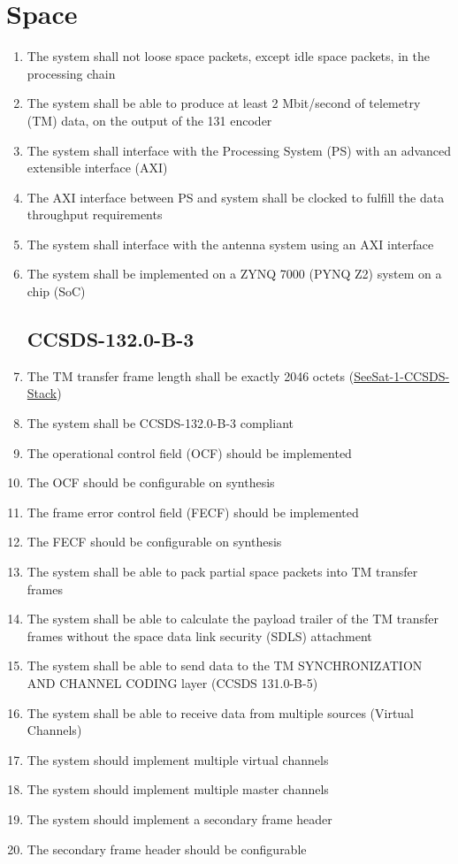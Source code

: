 \section{Space}
\begin{enumerate}[leftmargin=\dimexpr\linewidth-13cm-\rightmargin\relax,label={\bfseries{SPC-REQ-\arabic*}}]
    \item The system shall not loose space packets, except idle space packets, in the processing chain
    \item The system shall be able to produce at least 2 Mbit/second of telemetry (TM) data, on the output of the 131 encoder
    \item The system shall interface with the Processing System (PS) with an advanced extensible interface (AXI)
    \item The AXI interface between PS and system shall be clocked to fulfill the data throughput requirements
    \item The system shall interface with the antenna system using an AXI interface
    \item The system shall be implemented on a ZYNQ 7000 (PYNQ Z2) system on a chip (SoC)

\subsection{CCSDS-132.0-B-3}
    \item The TM transfer frame length shall be exactly 2046 octets (\href{https://nc.seesat.eu/f/205229}{SeeSat-1-CCSDS-Stack})
    \item The system shall be CCSDS-132.0-B-3 compliant
    \item The operational control field (OCF) should be implemented
    \item The OCF should be configurable on synthesis
    \item The frame error control field (FECF) should be implemented
    \item The FECF should be configurable on synthesis
    \item The system shall be able to pack partial space packets into TM transfer frames
    \item The system shall be able to calculate the payload trailer of the TM transfer frames without the space data link security (SDLS) attachment
    \item The system shall be able to send data to the TM SYNCHRONIZATION AND CHANNEL CODING layer (CCSDS 131.0-B-5)
    \item The system shall be able to receive data from multiple sources (Virtual Channels)
    \item The system should implement multiple virtual channels
    \item The system should implement multiple master channels
    \item The system should implement a secondary frame header
    \item The secondary frame header should be configurable


\end{enumerate}
